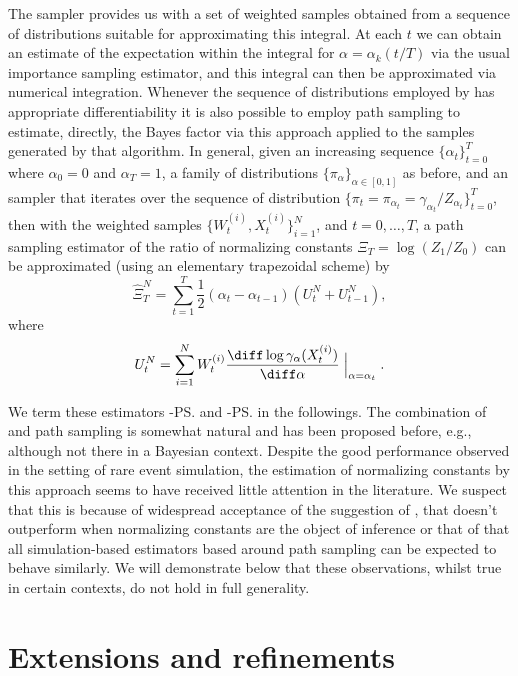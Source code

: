 The \smc sampler provides us with a set of weighted samples obtained from a
sequence of distributions suitable for approximating this integral. At each
$t$ we can obtain an estimate of the expectation within the integral for
$\alpha = \alpha_k(t/T)$ via the usual importance sampling estimator, and this
integral can then be approximated via numerical integration. Whenever the
sequence of distributions employed by \smc[3] has appropriate
differentiability it is also possible to employ path sampling to estimate,
directly, the Bayes factor via this approach applied to the samples generated
by that algorithm. In general, given an increasing sequence
$\{\alpha_t\}_{t=0}^T$ where $\alpha_0 = 0$ and $\alpha_T = 1$, a family of
distributions $\{\pi_{\alpha}\}_{\alpha\in[0,1]}$ as before, and an \smc
sampler that iterates over the sequence of distribution $\{\pi_t =
\pi_{\alpha_t} = \gamma_{\alpha_t}/Z_{\alpha_t}\}_{t=0}^T$, then with the
weighted samples $\{W_t^{(i)},X_t^{(i)}\}_{i=1}^N$, and $t = 0,\dots,T$, a
path sampling estimator of the ratio of normalizing constants $\Xi_T =
\log(Z_1/Z_0)$ can be approximated (using an elementary trapezoidal scheme) by
\begin{equation}
  \hat\Xi_{T}^{N} = \sum_{t=1}^T
  \frac{1}{2}(\alpha_t - \alpha_{t - 1})(U_t^N + U_{t-1}^N),
  \label{eq:path_est}
\end{equation}
where
\begin{equation}
  U_t^N = \sum_{i=1}^N
  W_t^{(i)} \frac{\diff\log\gamma_{\alpha}(X_t^{(i)})}{\diff\alpha}
  \Bigm|_{\alpha = \alpha_t}.
\end{equation}

We term these estimators \smc[2]-\ps and \smc[3]-\ps in the followings. The
combination of \smc and path sampling is somewhat natural and has been
proposed before, e.g., \cite{Johansen:2006wm} although not there in a Bayesian
context. Despite the good performance observed in the setting of rare
event simulation, the estimation of normalizing constants by this approach
seems to have received little attention in the literature. We suspect that
this is because of widespread acceptance of the suggestion of
\cite{DelMoral:2006hc}, that \smc doesn't outperform \ais when normalizing
constants are the object of inference or that of \cite{Calderhead:2009bd}
that all simulation-based estimators based around path sampling can be
expected to behave similarly. We will demonstrate below that these
observations, whilst true in certain contexts, do not hold in full generality.

\section{Extensions and refinements}
\label{sec:Extensions and refinements}

